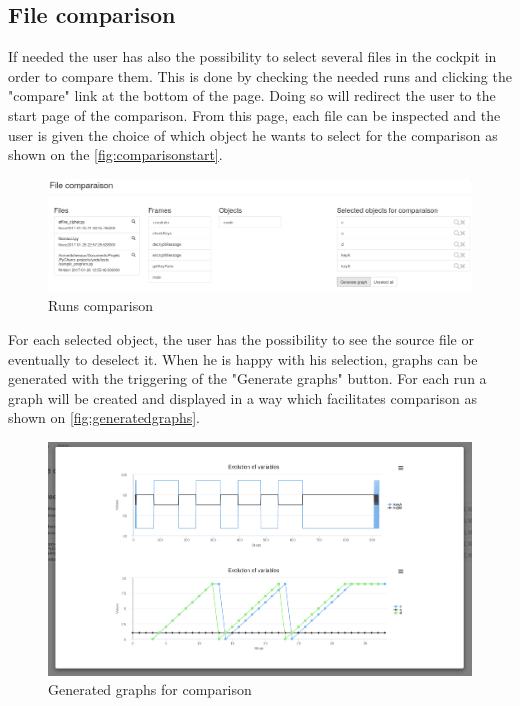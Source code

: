 \subsection{File comparison}
If needed the user has also the possibility to select several files in the cockpit in order to compare them. This is done by checking the needed runs and clicking the "compare" link at the bottom of the page. Doing so will redirect the user to the start page of the comparison. From this page, each file can be inspected and the user is given the choice of which object he wants to select for the comparison as shown on the \autoref{fig:comparisonstart}.
\begin{figure}[h!]
  \centering
    \includegraphics[width=\textwidth]{figures/yoda-comparison.png}
    \caption{Runs comparison}
    \label{fig:comparisonstart}
\end{figure}

For each selected object, the user has the possibility to see the source file or eventually to deselect it. When he is happy with his selection, graphs can be generated with the triggering of the "Generate graphs" button. For each run a graph will be created and displayed in a way which facilitates comparison as shown on \autoref{fig:generatedgraphs}.
\begin{figure}[h!]
  \centering
    \includegraphics[width=\textwidth]{figures/yoda-graphs.png}
    \caption{Generated graphs for comparison}
    \label{fig:generatedgraphs}
\end{figure}

